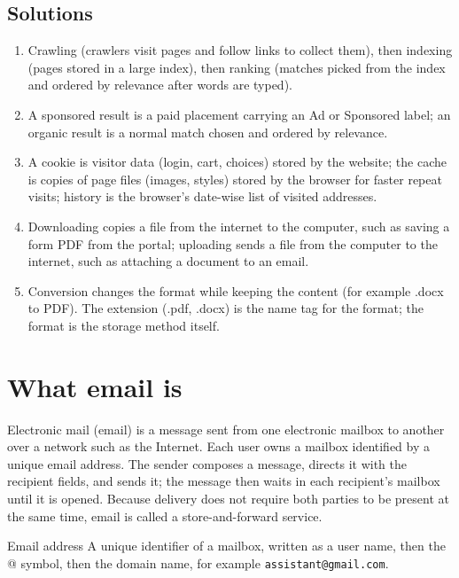 \subsection*{Solutions}
\begingroup\small
\begin{enumerate}[label=\arabic*.]
  \item Crawling (crawlers visit pages and follow links to collect them),
    then indexing (pages stored in a large index), then ranking (matches
    picked from the index and ordered by relevance after words are typed).
  \item A sponsored result is a paid placement carrying an Ad or Sponsored
    label; an organic result is a normal match chosen and ordered by
    relevance.
  \item A cookie is visitor data (login, cart, choices) stored by the
    website; the cache is copies of page files (images, styles) stored by
    the browser for faster repeat visits; history is the browser's
    date-wise list of visited addresses.
  \item Downloading copies a file from the internet to the computer, such as
    saving a form PDF from the portal; uploading sends a file from the
    computer to the internet, such as attaching a document to an email.
  \item Conversion changes the format while keeping the content (for example
    .docx to PDF). The extension (.pdf, .docx) is the name tag for the
    format; the format is the storage method itself.
\end{enumerate}
\endgroup

\section{What email is}
Electronic mail (email) is a message sent from one electronic mailbox to
another over a network such as the Internet. Each user owns a mailbox
identified by a unique email address. The sender composes a message, directs
it with the recipient fields, and sends it; the message then waits in each
recipient's mailbox until it is opened. Because delivery does not require both
parties to be present at the same time, email is called a store-and-forward
service.

\begin{definitionbox}{Email address}
A unique identifier of a mailbox, written as a user name, then the @ symbol,
then the domain name, for example \texttt{assistant@gmail.com}.
\end{definitionbox}


